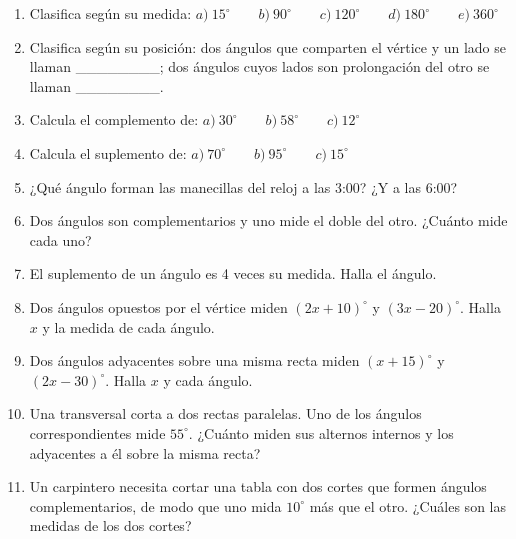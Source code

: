 \documentclass[12pt, letterpaper]{article}
\begin{document}
\begin{enumerate}[leftmargin=*, resume]
  \item \facil{} Clasifica según su medida: $a)\ 15^{\circ} \qquad b)\ 90^{\circ} \qquad c)\ 120^{\circ} \qquad d)\ 180^{\circ} \qquad e)\ 360^{\circ}$

  \item \facil{} Clasifica según su posición: dos ángulos que comparten el vértice y un lado se llaman \_\_\_\_\_\_\_\_; dos ángulos cuyos lados son prolongación del otro se llaman \_\_\_\_\_\_\_\_.

  \item \facil{} Calcula el complemento de: $a)\ 30^{\circ} \qquad b)\ 58^{\circ} \qquad c)\ 12^{\circ}$

  \item \facil{} Calcula el suplemento de: $a)\ 70^{\circ} \qquad b)\ 95^{\circ} \qquad c)\ 15^{\circ}$

  \item \facil{} ¿Qué ángulo forman las manecillas del reloj a las 3:00? ¿Y a las 6:00?

  \item \medio{} Dos ángulos son complementarios y uno mide el doble del otro. ¿Cuánto mide cada uno?

  \item \medio{} El suplemento de un ángulo es 4 veces su medida. Halla el ángulo.

  \item \medio{} Dos ángulos opuestos por el vértice miden $(2x + 10)^{\circ}$ y $(3x - 20)^{\circ}$. Halla $x$ y la medida de cada ángulo.

  \item \medio{} Dos ángulos adyacentes sobre una misma recta miden $(x + 15)^{\circ}$ y $(2x - 30)^{\circ}$. Halla $x$ y cada ángulo.

  \item \dificil{} Una transversal corta a dos rectas paralelas. Uno de los ángulos correspondientes mide $55^{\circ}$. ¿Cuánto miden sus alternos internos y los adyacentes a él sobre la misma recta?

  \item \dificil{} Un carpintero necesita cortar una tabla con dos cortes que formen ángulos complementarios, de modo que uno mida $10^{\circ}$ más que el otro. ¿Cuáles son las medidas de los dos cortes?
\end{enumerate}

\end{document}
